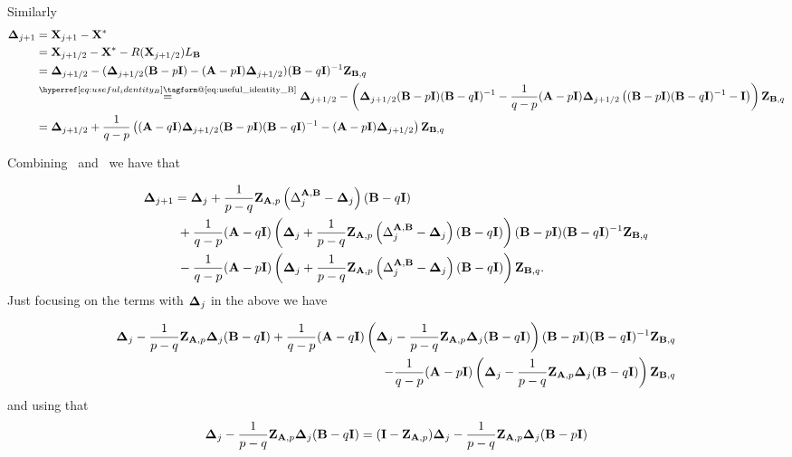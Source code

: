 \documentclass[10pt]{article}
\makeatletter
\renewcommand*{\eqref}[1]{%
  \hyperref[{#1}]{\textup{\tagform@{\ref*{#1}}}}%
}
\theoremstyle{definition}
\makeatother
\begin{document}
Similarly
\begin{align}
 \mDelta_{j+1} &=     \mX_{j+1}  -\mX^*  \nonumber \\
 &= \mX_{j+1/2} -\mX^* - R(\mX_{j+1/2}) L_{\mB} \nonumber\\
    &=  \mDelta_{j+1/2} - ( \mDelta_{j+1/2} (\mB-p\mI)  -(\mA-p\mI) \mDelta_{j+1/2} ) (\mB-q\mI)^{-1}\mZ_{\mB,q}   \nonumber\\
    &\overset{\eqref{eq:useful_identity_B}}{=} \mDelta_{j+1/2} - \left( \mDelta_{j+1/2} (\mB-p\mI)(\mB-q\mI)^{-1}  -\frac{1}{q-p}(\mA-p\mI) \mDelta_{j+1/2}\left(    (\mB - p \mI) (\mB - q \mI)^{-1}- \mI  \right) \right) \mZ_{\mB,q} \nonumber \\
    &= \mDelta_{j+1/2} +\frac{1}{q-p}\left( (\mA-q\mI)\mDelta_{j+1/2} (\mB-p\mI)(\mB-q\mI)^{-1}  -(\mA-p\mI) \mDelta_{j+1/2} \right) \mZ_{\mB,q}\nonumber \\
     \label{eq:deltajplsdev}
\end{align}

Combining~\eqref{eq:deltajhalfdev} and~\eqref{eq:deltajplsdev}  we have that

\begin{align*}
 {\bf \Delta}_{j+1}
    &=  {\bf \Delta}_j +\frac{1}{p-q}{\bf Z}_{{\bf A},p}\left( \Delta_j^{{\bf A},{\bf B}}     -{\bf \Delta}_j \right) ({\bf B}-q{\bf I})\\
    & \;  +\frac{1}{q-p}({\bf A}-q{\bf I}) \left( {\bf \Delta}_j +\frac{1}{p-q}{\bf Z}_{{\bf A},p}\left( \Delta_j^{{\bf A},{\bf B}}    -{\bf \Delta}_j \right) ({\bf B}-q{\bf I})\right) ({\bf B}-p{\bf I})({\bf B}-q{\bf I})^{-1}{\bf Z}_{{\bf B},q}  \\
    & \; -\frac{1}{q-p}({\bf A}-p{\bf I})  \left( {\bf \Delta}_j +\frac{1}{p-q}{\bf Z}_{{\bf A},p}\left( \Delta_j^{{\bf A},{\bf B}}    -{\bf \Delta}_j \right) ({\bf B}-q{\bf I})\right)   {\bf Z}_{{\bf B},q}.
\end{align*}
Just focusing on the terms with ${\bf \Delta}_j$ in the above we have

\begin{align*}
 {\bf \Delta}_j -\frac{1}{p-q}{\bf Z}_{{\bf A},p}{\bf \Delta}_j ({\bf B}-q{\bf I})+\frac{1}{q-p}({\bf A}-q{\bf I}) \left( {\bf \Delta}_j -\frac{1}{p-q}{\bf Z}_{{\bf A},p}{\bf \Delta}_j  ({\bf B}-q{\bf I})\right) ({\bf B}-p{\bf I})({\bf B}-q{\bf I})^{-1}{\bf Z}_{{\bf B},q} \\
 -\frac{1}{q-p}({\bf A}-p{\bf I})  \left( {\bf \Delta}_j -\frac{1}{p-q}{\bf Z}_{{\bf A},p} {\bf \Delta}_j  ({\bf B}-q{\bf I})\right)   {\bf Z}_{{\bf B},q}
\end{align*}
and using that
\begin{align}
{\bf \Delta}_j -\frac{1}{p-q}{\bf Z}_{{\bf A},p} {\bf \Delta}_j  ({\bf B}-q{\bf I}) = ({\bf I} - {\bf Z}_{{\bf A},p} ){\bf \Delta}_j  -\frac{1}{p-q}{\bf Z}_{{\bf A},p} {\bf \Delta}_j  ({\bf B}-p{\bf I})
\end{align}
\end{document}
